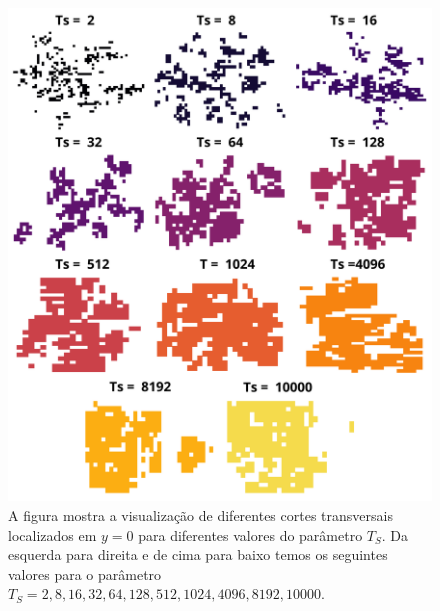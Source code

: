 \documentclass[11pt,a4paper]{article} %
\begin{document}
     
        \begin{figure}[H] 

            \centering 
            \includegraphics[width=\textwidth]{figures/cs_all.png} 
            \caption{A figura mostra a visualização de diferentes cortes transversais localizados em \(y=0\) para diferentes  
            valores do parâmetro \(T_{S}\). Da esquerda para direita e de cima para baixo temos os seguintes valores para o  
            parâmetro \(T_{S}=2,8,16,32,64,128,512,1024,4096,8192, 10000\).}  
            \label{R3} 

        \end{figure} 
\end{document}
